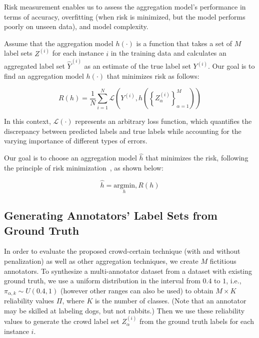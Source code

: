 Risk measurement enables us to assess the aggregation model's performance in terms of accuracy, overfitting (when risk is minimized, but the model performs poorly on unseen data), and model complexity.

Assume that the aggregation model $h (\cdot) $ is a function that takes a set of $M $ label sets $Z^{(i)} $ for each instance $i $ in the training data and calculates an aggregated label set $\widehat{Y}^{(i)} $ as an estimate of the true label set $Y^{(i)} $. Our goal is to find an aggregation model $h(\cdot) $ that minimizes risk as follows:

\begin{equation}
R(h) = \frac{1}{N} \sum_{i=1}^{N} \mathcal{L} \left( Y^{(i)}, h\left( {\left\{Z_{\alpha}^{(i)}\right\}}_{\alpha=1}^{M}\right)\right)
\label{eq:crowd.eq.2.risk.emp}
\end{equation}

In this context, $\mathcal{L}(\cdot) $ represents an arbitrary loss function, which quantifies the discrepancy between predicted labels and true labels while accounting for the varying importance of different types of errors.

Our goal is to choose an aggregation model $\widehat{h} $ that minimizes the risk, following the principle of risk minimization~\cite{vapnik_Principles_1991}, as shown below:

\begin{equation}
\widehat{h} = \underset{h}{\text{argmin}} , R(h)
\label{eq:crowd.eq.3.risk.h}
\end{equation}


\subsection{Generating Annotators’  Label Sets from Ground Truth}

In order to evaluate the proposed crowd-certain technique  (with and without penalization) as well as other aggregation techniques, we create $M$ fictitious annotators. To synthesize a multi-annotator dataset from a dataset with existing ground truth, we use a uniform distribution in the interval from $0.4 $ to $1 $, i.e., $\pi_{\alpha,k}\sim U\left(0.4,1\right) $ (however other ranges can also be used) to obtain $M \times  K$ reliability values $\Pi $, where $K$ is the number of classes. (Note that
an annotator may be skilled at labeling dogs, but not rabbits.) Then we use these reliability values to generate the crowd label set $Z_{\alpha}^{(i)} $ from the ground truth labels for each instance $i $.

